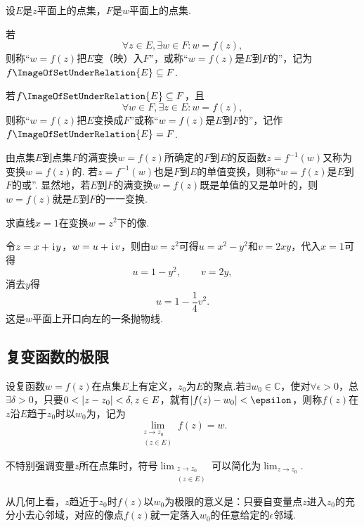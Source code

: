 \begin{definition}
设\(E\)是\(z\)平面上的点集，\(F\)是\(w\)平面上的点集.

若\begin{equation*}
\forall z \in E, \exists w \in F : w = f(z),
\end{equation*}则称“\(w=f(z)\)把\(E\)变（映）入\(F\)”，或称“\(w=f(z)\)是\(E\)到\(F\)的”，记为\(f\ImageOfSetUnderRelation{E} \subseteq F\).

若\(f\ImageOfSetUnderRelation{E} \subseteq F\)，且\begin{equation*}
\forall w \in F, \exists z \in E : w = f(z),
\end{equation*}则称“\(w = f(z)\)把\(E\)变换成\(F\)”或称“\(w = f(z)\)是\(E\)到\(F\)的”，记作\(f\ImageOfSetUnderRelation{E} = F\).

由点集\(E\)到点集\(F\)的满变换\(w = f(z)\)所确定的\(F\)到\(E\)的反函数\(z=f^{-1}(w)\)又称为变换\(w = f(z)\)的.
若\(z=f^{-1}(w)\)也是\(F\)到\(E\)的单值变换，则称“\(w = f(z)\)是\(E\)到\(F\)的或”.
显然地，若\(E\)到\(F\)的满变换\(w = f(z)\)既是单值的又是单叶的，则\(w = f(z)\)就是\(E\)到\(F\)的一一变换.
\end{definition}

\begin{example}
求直线\(x=1\)在变换\(w=z^2\)下的像.
\begin{solution}
令\(z=x+\kern1pt\mathrm{i}\kern1pt y\)，\(w=u+\kern1pt\mathrm{i}\kern1pt v\)，则由\(w=z^2\)可得\(u=x^2-y^2\)和\(v=2xy\)，代入\(x=1\)可得\begin{equation*}
u=1-y^2, \qquad v=2y,
\end{equation*}消去\(y\)得\begin{equation*}
u=1-\frac{1}{4} v^2.
\end{equation*}这是\(w\)平面上开口向左的一条抛物线.
\end{solution}
\end{example}

\subsection{复变函数的极限}
\begin{definition}
设复函数\(w=f(z)\)在点集\(E\)上有定义，\(z_0\)为\(E\)的聚点.若\(\exists w_0 \in \mathbb{C}\)，使对\(\forall \epsilon > 0\)，总\(\exists \delta > 0\)，只要\(0<\abs{z-z_0}<\delta, z \in E\)，就有\(\abs{f(z)-w_0} < \epsilon\)，则称\(f(z)\)在\(z\)沿\(E\)趋于\(z_0\)时以\(w_0\)为，记为\begin{equation*}
\lim_{\substack{z \to z_0 \\ (z \in E)}} f(z) = w.
\end{equation*}

不特别强调变量\(z\)所在点集时，符号\(\lim_{\substack{z \to z_0 \\ (z \in E)}}\)可以简化为\(\lim_{z \to z_0}\).
\end{definition}
从几何上看，\(z\)趋近于\(z_0\)时\(f(z)\)以\(w_0\)为极限的意义是：只要自变量点\(z\)进入\(z_0\)的充分小去心邻域，对应的像点\(f(z)\)就一定落入\(w_0\)的任意给定的\(\epsilon\)邻域.

